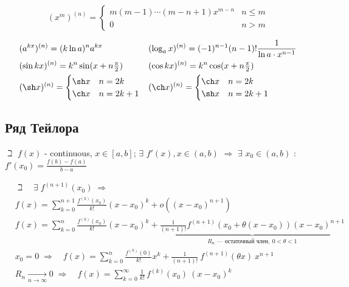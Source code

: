 \documentclass[a4paper,11pt]{article}
\begin{document}
\[
(x^m)^{(n)} =
    \begin{cases}
        m(m-1)\cdots(m-n+1)x^{m-n} & n \leqslant m \\
        0                          & n > m
    \end{cases}
\]

\begin{mdframed}[innertopmargin=-.6\baselineskip,linewidth=.8pt]
\begin{align*}
  & (a^{kx})^{(n)} = (k \ln a)^n a^{kx}
 && (\log_{a}x)^{(n)} = (-1)^{n-1} (n-1)! \frac 1 {\ln a \cdot x^{n-1}}
\\& (\sin kx)^{(n)} = k^n \sin(x + n \tfrac{\pi}{2})
 && (\cos kx)^{(n)} = k^n \cos(x + n \tfrac{\pi}{2})
\\& (\sh x)^{(n)} = \begin{cases} \sh x & n=2k \\ \ch x & n=2k+1 \end{cases}
 && (\ch x)^{(n)} = \begin{cases} \ch x & n=2k \\ \sh x & n=2k+1 \end{cases}
\end{align*}
\end{mdframed}


\subsection{Ряд Тейлора}

$\beth$ $f(x)$ - continuous, $x\in[a,b]$;
$\exists$ $f'(x), x\in(a,b)$ $\Rightarrow$
$\exists$ $x_0\in(a,b)$ :\quad $\displaystyle f'(x_0)=\frac{f(b)-f(a)}{b-a}$

\begin{align*}
  & \beth \quad \exists \; f^{(n+1)}(x_0) \; \Rightarrow
\\& f(x)=\sum_{k=0}^{n+1}{ \frac {f^{(k)}(x_0)} {k!} (x-x_0)^k }
        + o\left((x-x_0)^{n+1}\right)
\\& f(x)=\sum_{k=0}^{n}{ \frac {f^{(k)}(x_0)} {k!} (x-x_0)^k }
        + \underbrace{ \frac{1}{(n+1)!} f^{(n+1)} \left( x_0 + \theta(x-x_0) \right) (x-x_0)^{n+1} }
                    _{ R_n \text{ --- остаточный член}, \: 0 < \theta < 1 }
\\& x_0 = 0
    \; \Rightarrow \quad
    f(x)=\sum_{k=0}^{n}{ \frac {f^{(k)}(0)} {k!} x^k }
    + \frac{1}{(n+1)!} \: f^{(n+1)} ( \theta x ) \: x^{n+1}
\\& R_n \xrightarrow[n\rightarrow\infty]{} 0
    \; \Rightarrow \quad
    f(x)=\sum_{k=0}^{\infty}{ \frac{1}{k!} \, f^{(k)}(x_0) \: (x-x_0)^k }
\end{align*}
\end{document}
